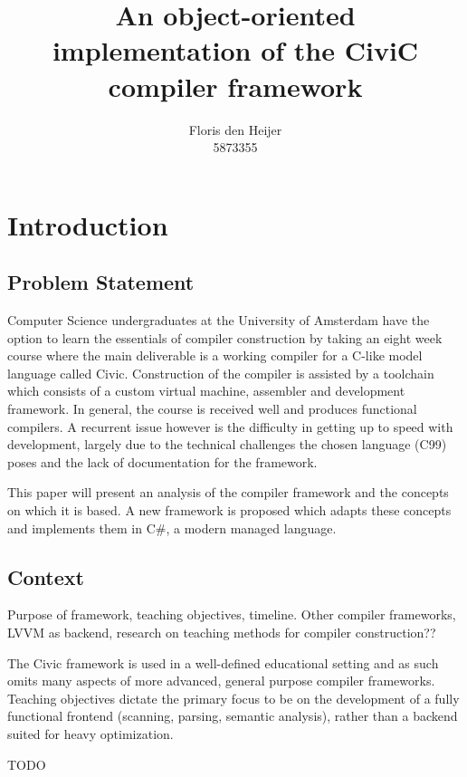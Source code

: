 \documentclass[twoside,openright]{uva-bachelor-thesis}
\title{An object-oriented \\implementation of the CiviC compiler framework}
\author{Floris den Heijer\\5873355}
\begin{document}
\maketitle
\begin{abstract}
	\lipsum
\end{abstract}

\tableofcontents


\chapter{Introduction}
	\section{Problem Statement}
		Computer Science undergraduates at the University of Amsterdam have the option to learn the essentials of compiler construction by taking an eight week course where the main deliverable is a working compiler for a C-like model language called Civic. Construction of the compiler is assisted by a toolchain which consists of a custom virtual machine, assembler and development framework. In general, the course is received well and produces functional compilers. A recurrent issue however is the difficulty in getting up to speed with development, largely due to the technical challenges the chosen language (C99) poses and the lack of documentation for the framework.
		
		This paper will present an analysis of the compiler framework and the concepts on which it is based. A new framework is proposed which adapts these concepts and implements them in C\#, a modern managed language.
			
	\section{Context}
		Purpose of framework, teaching objectives, timeline.
		Other compiler frameworks, LVVM as backend, research on teaching methods for compiler construction??
		
		The Civic framework is used in a well-defined educational setting and as such omits many aspects of more advanced, general purpose compiler frameworks. Teaching objectives dictate the primary focus to be on the development of a fully functional frontend (scanning, parsing, semantic analysis), rather than a backend suited for heavy optimization.
		
		TODO
	
\end{document}
